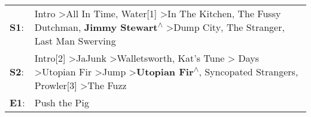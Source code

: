 \begin{supertabular}{p{0.03\textwidth}p{0.92\textwidth}}
 \textbf{S1}:  &                                                                                                            Intro\textsuperscript{} \textgreater \enspace All In Time\textsuperscript{}, \enspace Water[1]\textsuperscript{} \textgreater \enspace In The Kitchen\textsuperscript{}, \enspace The Fussy Dutchman\textsuperscript{}, \enspace \textbf{Jimmy Stewart\textsuperscript{$\wedge$}} \textgreater \enspace Dump City\textsuperscript{}, \enspace The Stranger\textsuperscript{}, \enspace Last Man Swerving\textsuperscript{}  \enspace  \\
 \textbf{S2}:  &  Intro[2]\textsuperscript{} \textgreater \enspace JaJunk\textsuperscript{} \textgreater \enspace Walletsworth\textsuperscript{}, \enspace Kat's Tune\textsuperscript{} \textgreater {} Days\textsuperscript{} \textgreater \enspace Utopian Fir\textsuperscript{} \textgreater \enspace Jump\textsuperscript{} \textgreater \enspace \textbf{Utopian Fir\textsuperscript{$\wedge$}}, \enspace Syncopated Strangers\textsuperscript{}, \enspace Prowler[3]\textsuperscript{} \textgreater \enspace The Fuzz\textsuperscript{}  \enspace  \\
 \textbf{E1}:  &                                                                                                                                                                                                                                                                                                                                                                                                                                                                                                        Push the Pig\textsuperscript{}  \enspace  \\
\end{supertabular}
